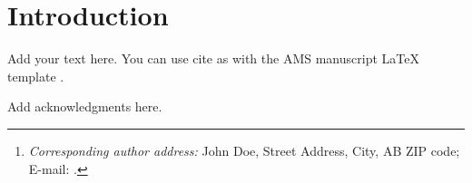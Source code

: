 \documentclass[9pt]{amsextabs}
\author{\normalsize{John Doe}\thanks{\noindent\textit{Corresponding author address:}
        John Doe, Street Address, City, AB ZIP code;\newline
        E-mail: \href{mailto:}{}.}\\
       \small{\textit{Affliliation}}
}
\begin{document}
\extabstitle
\saythanks
\section{Introduction}
Add your text here. You can use cite as with the AMS manuscript LaTeX
template \citep[e.g.,][]{Eliassen1951}.

\acknowledgments
Add acknowledgments here.



\end{document}
